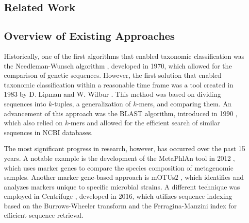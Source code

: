 \documentclass[pdflatex,sn-vancouver-num]{sn-jnl}%
\begin{document}



        \subsection{Related Work}
            \subsection{Overview of Existing Approaches}
                Historically, one of the first algorithms that enabled taxonomic classification was the Needleman-Wunsch algorithm \cite{Needleman:1970}, developed in 1970, which allowed for the comparison of genetic sequences. However, the first solution that enabled taxonomic classification within a reasonable time frame was a tool created in 1983 by D. Lipman and W. Wilbur \cite{Wilbur:1983}. This method was based on dividing sequences into $k$-tuples, a generalization of $k$-mers, and comparing them. An advancement of this approach was the BLAST algorithm, introduced in 1990 \cite{Altschul:1990}, which also relied on $k$-mers and allowed for the efficient search of similar sequences in NCBI databases.

                The most significant progress in research, however, has occurred over the past 15 years. A notable example is the development of the MetaPhlAn tool in 2012 \cite{Segata:2012}, which uses marker genes to compare the species composition of metagenomic samples. Another marker gene-based approach is mOTUs2 \cite{Milanese:2019}, which identifies and analyzes markers unique to specific microbial strains. A different technique was employed in Centrifuge \cite{Kim:2016}, developed in 2016, which utilizes sequence indexing based on the Burrows-Wheeler transform \cite{Burrows:1994} and the Ferragina-Manzini index \cite{Ferragina:2000} for efficient sequence retrieval.
            
\end{document}
